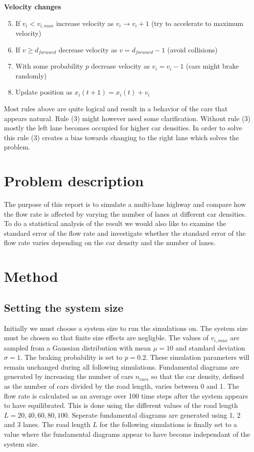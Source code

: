 \documentclass[a4paper,12pt]{article}
\begin{document}
\textbf{Velocity changes}
\begin{enumerate}
    \setcounter{enumi}{4}
    \item If $v_i<v_{i, max}$ increase velocity as $v_i \rightarrow v_i+1$ (try to accelerate to maximum velocity)
    \item If $v \geq d_{forward}$ decrease velocity as $v = d_{forward} - 1$ (avoid collisions)
    \item With some probability $p$ decrease velocity as $v_i=v_i-1$ (cars might brake randomly)
    \item Update position as $x_i(t+1) = x_i(t) + v_i$
\end{enumerate}

Most rules above are quite logical and result in a behavior of the cars that appears natural. Rule (3) might however need some
clarification. Without rule (3) mostly the left lane becomes occupied for higher car densities. In order to solve this rule (3) creates
a bias towards changing to the right lane which solves the problem.


\section*{Problem description}
The purpose of this report is to simulate a multi-lane highway and compare how the flow rate is affected by varying the number
of lanes at different car densities.
To do a statistical analysis of the result we would also like to examine the standard error of the flow rate and investigate whether the 
standard error of the flow rate varies depending on the car density and the number of lanes.

\section*{Method}
\subsection*{Setting the system size}
Initially we must choose a system size to run the simulations on. The system size must be chosen so that finite size effects are negligble.
The values of $v_{i,max}$ are sampled from a Gaussian distribution with mean $\mu = 10$ and standard deviation $\sigma = 1$. The braking probability
is set to $p=0.2$. These simulation parameters will remain unchanged during all following simulations. Fundamental diagrams are generated
by increasing the number of cars $n_{cars}$ so that the car density, defined as the number of cars divided by the road length, varies between 0 and 1.
The flow rate is calculated as an average over 100 time steps after the system appears to have equilibrated.
This is done using the different values of the road length $L=20, 40, 60, 80, 100$. Seperate fundamental diagrams are generated using 1, 2 and 3 lanes.
The road length $L$ for the following simulations is finally set to a value where the fundamental diagrams appear to have become independant of the system size.
\end{document}
